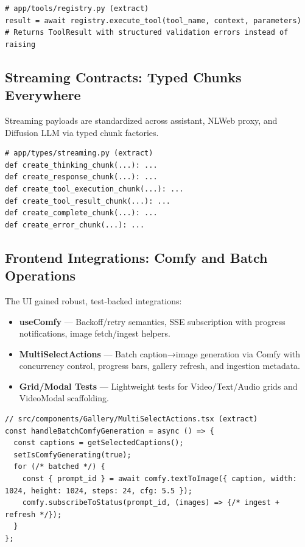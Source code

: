 \documentclass[11pt]{article}
\begin{document}
\begin{lstlisting}[style=python]
# app/tools/registry.py (extract)
result = await registry.execute_tool(tool_name, context, parameters)
# Returns ToolResult with structured validation errors instead of raising
\end{lstlisting}

\subsection{Streaming Contracts: Typed Chunks Everywhere}

Streaming payloads are standardized across assistant, NLWeb proxy, and Diffusion LLM via typed chunk factories.

\begin{lstlisting}[style=python]
# app/types/streaming.py (extract)
def create_thinking_chunk(...): ...
def create_response_chunk(...): ...
def create_tool_execution_chunk(...): ...
def create_tool_result_chunk(...): ...
def create_complete_chunk(...): ...
def create_error_chunk(...): ...
\end{lstlisting}

\subsection{Frontend Integrations: Comfy and Batch Operations}

The UI gained robust, test-backed integrations:

\begin{itemize}
  \item \textbf{useComfy} — Backoff/retry semantics, SSE subscription with progress notifications, image fetch/ingest helpers.
  \item \textbf{MultiSelectActions} — Batch caption→image generation via Comfy with concurrency control, progress bars, gallery refresh, and ingestion metadata.
  \item \textbf{Grid/Modal Tests} — Lightweight tests for Video/Text/Audio grids and VideoModal scaffolding.
\end{itemize}

\begin{lstlisting}[style=typescript]
// src/components/Gallery/MultiSelectActions.tsx (extract)
const handleBatchComfyGeneration = async () => {
  const captions = getSelectedCaptions();
  setIsComfyGenerating(true);
  for (/* batched */) {
    const { prompt_id } = await comfy.textToImage({ caption, width: 1024, height: 1024, steps: 24, cfg: 5.5 });
    comfy.subscribeToStatus(prompt_id, (images) => {/* ingest + refresh */});
  }
};
\end{lstlisting}
\end{document}
